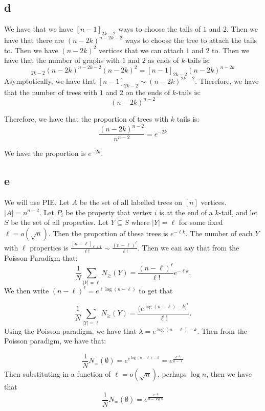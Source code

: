 \documentclass[]{article}
\begin{document}
\subsection{d}

We have that we have $[n - 1]_{2k - 2}$ ways to choose the tails of $1$ and $2$. Then we have that there are $(n- 2k)^{n - 2k - 2}$ ways to choose the tree to attach the tails to. Then we have $(n - 2k)^2$ vertices that we can attach $1 $ and $2$ to. Then we have that the number of graphs with $1$ and $2$ as ends of $k$-tails is:
\begin{equation}
	[n - 1]_{2k - 2} (n - 2k)^{n - 2k - 2}(n - 2k)^2 = [n - 1]_{2k - 2} (n - 2k)^{n - 2k}
\end{equation}
Asymptotically, we have that $[n - 1]_{2k - 2} \sim (n - 2k)^{2k - 2}$. Therefore, we have that the number of trees with $1$ and $2$ on the ends of $k$-tails is:
\begin{equation}
	(n - 2k)^{n - 2}
\end{equation}

Therefore, we have that the proportion of trees with $k$ tails is:
\begin{equation}
	\frac{(n - 2k)^{n - 2}}{n^{n - 2}} = e^{-2k}
\end{equation}

We have the proportion is $e^{-2k}$. 

\subsection{e}
We will use PIE. Let $A$ be the set of all labelled trees on $[n]$ vertices. $|A| = n^{n - 2}$. Let $P_i$ be the property that vertex $i$ is at the end of a $k$-tail, and let $S$ be the set of all properties. Let $Y \subseteq S$ where $|Y| = \ell$ for some fixed $\ell = o(\sqrt{n}) $. Then the proportion of these trees is $e^{-\ell k}$. The number of each $Y$ with $\ell$ properties is $\frac{[n - \ell]_{\ell + 1}}{\ell!} \sim \frac{(n - \ell)^\ell}{\ell!}$. Then we can say that from the Poisson Paradigm that:
\begin{equation}
	\frac{1}{N}\sum_{|Y| = \ell}N_\geq(Y) = \frac{(n - \ell)^\ell}{\ell!} e^{-\ell k}.
\end{equation}
We then write $(n - \ell)^\ell = e^{\ell \log(n - \ell)}$ to get that 

\begin{equation}
	\frac{1}{N}\sum_{|Y| = \ell}N_\geq(Y) = \frac{(e^{\log(n - \ell) - k)^\ell}}{\ell!}.
\end{equation}
Using the Poisson paradigm, we have that $\lambda = e^{\log(n - \ell) - k}$. 
Then from the Poisson paradigm, we have that:

\begin{equation}
	\frac{1}{N}N_= (\emptyset) = e^{e^{\log(n - \ell) - k}} = e^{\frac{e^{-k}}{n - \ell}}
\end{equation}
Then substituting in a function of $\ell = o(\sqrt{n})$, perhaps $\log n$, then we have that 
\begin{equation}
	\frac{1}{N}N_= (\emptyset)= e^{\frac{e^{-k}}{n - \log n}}
\end{equation}
\end{document}
